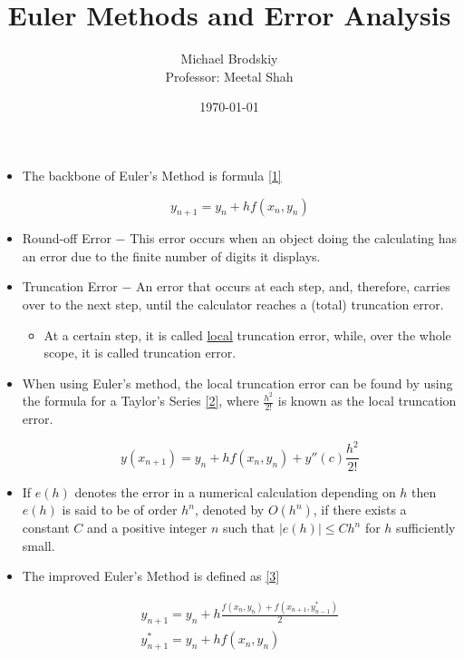 \documentclass[12pt]{article}
\title{Euler Methods and Error Analysis}
\date{\today}
\author{Michael Brodskiy\\ \small Professor: Meetal Shah}
\begin{document}
\maketitle

\begin{itemize}

  \item The backbone of Euler's Method is formula \eqref{1}

    \begin{equation}
      y_{n+1}=y_n+hf(x_n,y_n)
      \label{1}
    \end{equation}

  \item Round-off Error $-$ This error occurs when an object doing the calculating has an error due to the finite number of digits it displays.

  \item Truncation Error $-$ An error that occurs at each step, and, therefore, carries over to the next step, until the calculator reaches a (total) truncation error.

    \begin{itemize}

      \item At a certain step, it is called \underline{local} truncation error, while, over the whole scope, it is called  truncation error.

    \end{itemize}

  \item When using Euler's method, the local truncation error can be found by using the formula for a Taylor's Series \eqref{2}, where $\frac{h^2}{2!}$ is known as the local truncation error.

    \begin{equation}
      y(x_{n+1})=y_n+hf(x_n,y_n)+y''(c)\frac{h^2}{2!}
      \label{2}
    \end{equation}

  \item If $e(h)$ denotes the error in a numerical calculation depending on $h$ then $e(h)$ is said to be of order $h^n$, denoted by $O(h^n)$, if there exists a constant $C$ and a positive integer $n$ such that $|e(h)|\leq Ch^n$ for $h$ sufficiently small.

  \item The improved Euler's Method is defined as \eqref{3}

    \begin{equation}
      \begin{split}
      y_{n+1}=y_n+h\frac{f(x_n,y_n)+f(x_{n+1},y^*_{n-1})}{2}\\
      y^*_{n+1}=y_n+hf(x_n,y_n)
    \end{split}
      \label{3}
    \end{equation}


\end{itemize}
\end{document}
